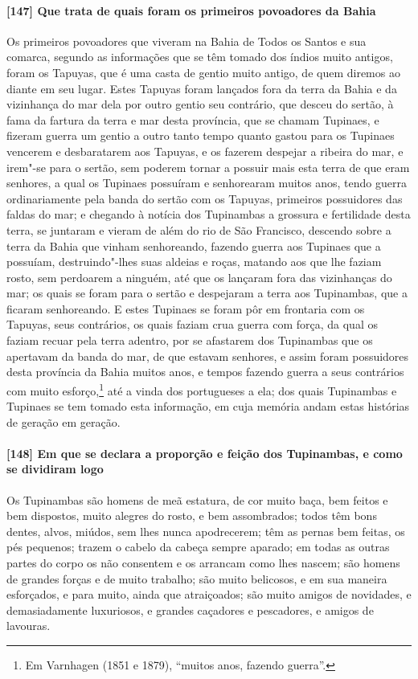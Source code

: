 \paragraph{[147] Que trata de quais foram os primeiros povoadores da Bahia}\quad
Os primeiros povoadores que viveram na Bahia de Todos os Santos e sua comarca, segundo as
informações que se têm tomado dos índios muito antigos, foram os Tapuyas, que é uma casta
de gentio muito antigo, de quem diremos ao diante em seu lugar. Estes Tapuyas foram
lançados fora da terra da Bahia e da vizinhança do mar dela por outro gentio seu
contrário, que desceu do sertão, à fama da fartura da terra e mar desta província, que se
chamam Tupinaes, e fizeram guerra um gentio a outro tanto tempo quanto gastou para os
Tupinaes vencerem e desbaratarem aos Tapuyas, e os fazerem despejar a ribeira do mar, e
irem"-se para o sertão, sem poderem tornar a possuir mais esta terra de que eram senhores,
a qual os Tupinaes possuíram e senhorearam muitos anos, tendo guerra ordinariamente pela
banda do sertão com os Tapuyas, primeiros possuidores das faldas do mar; e chegando à
notícia dos Tupinambas a grossura e fertilidade desta terra, se juntaram e vieram de além
do rio de São Francisco, descendo sobre a terra da Bahia que vinham senhoreando, fazendo
guerra aos Tupinaes que a possuíam, destruindo"-lhes suas aldeias e roças, matando aos que
lhe faziam rosto, sem perdoarem a ninguém, até que os lançaram fora das vizinhanças do
mar; os quais se foram para o sertão e despejaram a terra aos Tupinambas, que a ficaram
senhoreando. E estes Tupinaes se foram pôr em frontaria com os Tapuyas, seus contrários,
os quais faziam crua guerra com força, da qual os faziam recuar pela terra adentro, por se
afastarem dos Tupinambas que os apertavam da banda do mar, de que estavam senhores, e
assim foram possuidores desta província da Bahia muitos anos, e tempos fazendo guerra a
seus contrários com muito esforço,\footnote{ Em Varnhagen (1851 e 1879), ``muitos anos,
fazendo guerra''.} até a vinda dos portugueses a ela; dos quais Tupinambas e Tupinaes se
tem tomado esta informação, em cuja memória andam estas histórias de geração em geração.

\paragraph{[148] Em que se declara a proporção e feição dos Tupinambas, e como se dividiram
logo}\quad
Os Tupinambas são homens de meã estatura, de cor muito baça, bem feitos e bem dispostos,
muito alegres do rosto, e bem assombrados; todos têm bons dentes, alvos, miúdos, sem lhes
nunca apodrecerem; têm as pernas bem feitas, os pés pequenos; trazem o cabelo da cabeça
sempre aparado; em todas as outras partes do corpo os não consentem e os arrancam como
lhes nascem; são homens de grandes forças e de muito trabalho; são muito belicosos, e em
sua maneira esforçados, e para muito, ainda que atraiçoados; são muito amigos de
novidades, e demasiadamente luxuriosos, e grandes caçadores e pescadores, e amigos de
lavouras.

